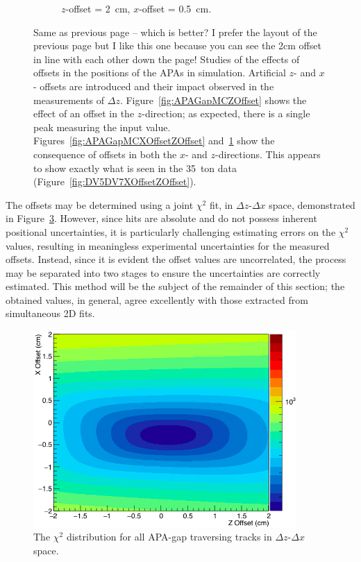 \begin{figure}
\begin{subfigure}[t]{\linewidth}
    \caption{$z$-offset = 2~cm, $x$-offset = 0.5~cm.}
    \label{fig:APAGapMCXOffsetZOffsetAngle}
  \end{subfigure}
  \caption[Studies of the effects of offsets in the positions of the APAs in simulation.]{{\color{red} Same as previous page -- which is better?  I prefer the layout of the previous page but I like this one because you can see the 2cm offset in line with each other down the page!}  Studies of the effects of offsets in the positions of the APAs in simulation.  Artificial $z$- and $x$- offsets are introduced and their impact observed in the measurements of $\Delta z$.  Figure~\ref{fig:APAGapMCZOffset} shows the effect of an offset in the $z$-direction; as expected, there is a single peak measuring the input value.  Figures~\ref{fig:APAGapMCXOffsetZOffset} and~\ref{fig:APAGapMCXOffsetZOffsetAngle} show the consequence of offsets in both the $x$- and $z$-directions.  This appears to show exactly what is seen in the 35~ton data (Figure~\ref{fig:DV5DV7XOffsetZOffset}).}
  \label{fig:APAGapMC}
\end{figure}

The offsets may be determined using a joint $\chi^2$ fit, in $\Delta z$-$\Delta x$ space, demonstrated in Figure~\ref{fig:DV5DV7CombinedOffsets}.  However, since hits are absolute and do not possess inherent positional uncertainties, it is particularly challenging estimating errors on the $\chi^2$ values, resulting in meaningless experimental uncertainties for the measured offsets.  Instead, since it is evident the offset values are uncorrelated, the process may be separated into two stages to ensure the uncertainties are correctly estimated.  This method will be the subject of the remainder of this section; the obtained values, in general, agree excellently with those extracted from simultaneous 2D fits.

\begin{figure}
  \centering
  \includegraphics[width=10cm]{TPC5TPC7CombinedOffsets.png}
  \caption[The $\chi^2$ distribution for all APA-gap traversing tracks in $\Delta z$-$\Delta x$ space.]{The $\chi^2$ distribution for all APA-gap traversing tracks in $\Delta z$-$\Delta x$ space.}
  \label{fig:DV5DV7CombinedOffsets}
\end{figure}

